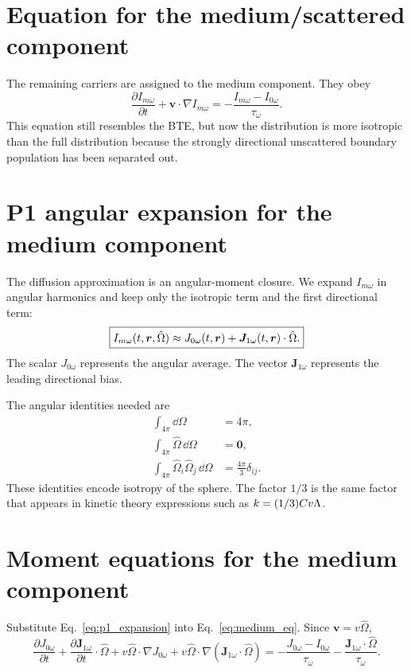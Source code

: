 \documentclass[11pt]{article}
\begin{document}
\section{Equation for the medium/scattered component}
The remaining carriers are assigned to the medium component. They obey
\begin{equation}
    \boxed{\frac{\partial I_{m\omega}}{\partial t}
    +\bm{v}\cdot\nabla I_{m\omega}
    =-\frac{I_{m\omega}-I_{0\omega}}{\tau_\omega}.}
    \label{eq:medium_eq}
\end{equation}
This equation still resembles the BTE, but now the distribution is more isotropic than the full distribution because the strongly directional unscattered boundary population has been separated out.

\section{P1 angular expansion for the medium component}
The diffusion approximation is an angular-moment closure. We expand \(I_{m\omega}\) in angular harmonics and keep only the isotropic term and the first directional term:
\begin{equation}
    \boxed{I_{m\omega}(t,\bm{r},\hat{\Omega})
    \approx J_{0\omega}(t,\bm{r})+\bm{J}_{1\omega}(t,\bm{r})\cdot\hat{\Omega}.}
    \label{eq:p1_expansion}
\end{equation}
The scalar \(J_{0\omega}\) represents the angular average. The vector \(\bm{J}_{1\omega}\) represents the leading directional bias.

The angular identities needed are
\begin{align}
    \int_{4\pi}\dd\Omega &=4\pi,\\
    \int_{4\pi}\hat{\Omega}\,\dd\Omega &=\bm{0},\\
    \int_{4\pi}\hat{\Omega}_i\hat{\Omega}_j\,\dd\Omega &=\frac{4\pi}{3}\delta_{ij}.
    \label{eq:angular_identities}
\end{align}
These identities encode isotropy of the sphere. The factor \(1/3\) is the same factor that appears in kinetic theory expressions such as \(k=(1/3)Cv\Lambda\).

\section{Moment equations for the medium component}
Substitute Eq.~\eqref{eq:p1_expansion} into Eq.~\eqref{eq:medium_eq}. Since \(\bm{v}=v\hat{\Omega}\),
\begin{equation}
    \frac{\partial J_{0\omega}}{\partial t}
    +\frac{\partial \bm{J}_{1\omega}}{\partial t}\cdot\hat{\Omega}
    +v\hat{\Omega}\cdot\nabla J_{0\omega}
    +v\hat{\Omega}\cdot\nabla(\bm{J}_{1\omega}\cdot\hat{\Omega})
    =-\frac{J_{0\omega}-I_{0\omega}}{\tau_\omega}
    -\frac{\bm{J}_{1\omega}\cdot\hat{\Omega}}{\tau_\omega}.
    \label{eq:substituted_p1}
\end{equation}
\end{document}
